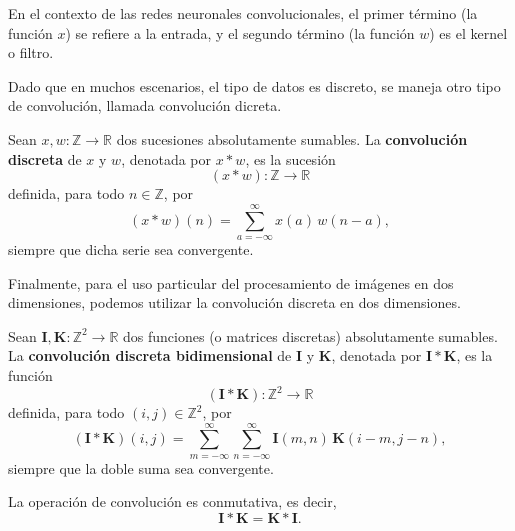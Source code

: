 En el contexto de las redes neuronales convolucionales, el primer término (la función $x$) se refiere a la entrada, y el segundo término (la función $w$) es el kernel o filtro.

Dado que en muchos escenarios, el tipo de datos es discreto, se maneja otro tipo de convolución, llamada convolución dicreta.
\begin{definition}
    Sean $x, w : \mathbb{Z} \to \mathbb{R}$ dos sucesiones absolutamente sumables.
    La \textbf{convolución discreta} de $x$ y $w$, denotada por $x \ast w$, es la sucesión
    \[
        (x \ast w) : \mathbb{Z} \to \mathbb{R}
    \]
    definida, para todo $n \in \mathbb{Z}$, por
    \[
        (x \ast w)(n) = \sum_{a=-\infty}^{\infty} x(a)\, w(n - a),
    \]
    siempre que dicha serie sea convergente.
\end{definition}

Finalmente, para el uso particular del procesamiento de imágenes en dos dimensiones, podemos utilizar la convolución discreta en dos dimensiones.

\begin{definition}
    Sean $\mathbf{I}, \mathbf{K} : \mathbb{Z}^2 \to \mathbb{R}$ dos funciones (o matrices discretas) absolutamente sumables.
    La \textbf{convolución discreta bidimensional} de $\mathbf{I}$ y $\mathbf{K}$, denotada por $\mathbf{I} \ast \mathbf{K}$, es la función
    \[
        (\mathbf{I} \ast \mathbf{K}) : \mathbb{Z}^2 \to \mathbb{R}
    \]
    definida, para todo $(i,j) \in \mathbb{Z}^2$, por
    \[
        (\mathbf{I} \ast \mathbf{K})(i,j) = \sum_{m=-\infty}^{\infty} \sum_{n=-\infty}^{\infty}
        \mathbf{I}(m,n)\, \mathbf{K}(i - m, j - n),
    \]
    siempre que la doble suma sea convergente.
\end{definition}

\begin{observation}
    La operación de convolución es conmutativa, es decir,
    \[
        \mathbf{I} \ast \mathbf{K} = \mathbf{K} \ast \mathbf{I}.
    \]
\end{observation}

